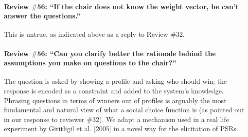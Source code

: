 \documentclass{article}
\begin{document}

\paragraph{Review $\#$56: “If the chair does not know the weight vector, he can’t answer the questions.”}
This is untrue, as indicated above as a reply to Review \#32.

\paragraph{Review $\#$56: “Can you clarify better the rationale behind the assumptions you make on questions to the chair?”}
The question is asked by showing a profile and asking who should win; the response is encoded as a constraint and added to the system’s knowledge. Phrasing questions in terms of winners out of profiles is arguably the most fundamental and natural view of what a social choice function is (as pointed out in our response to reviewer $\#$32). We adapt a mechanism used in a real life experiment by Giritligil et al. [2005] in a novel way for the elicitation of PSRs.
\end{document}
